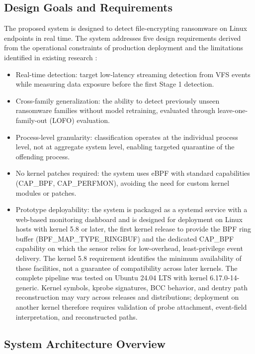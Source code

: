 \subsection{Design Goals and Requirements}\label{sec:3.1.1}

The proposed system is designed to detect file-encrypting ransomware on Linux endpoints in real time. The system addresses five design requirements derived from the operational constraints of production deployment and the limitations identified in existing research \cite{ref9}:

\begin{itemize}
\item Real-time detection: target low-latency streaming detection from VFS events while measuring data exposure before the first Stage 1 detection.
\item Cross-family generalization: the ability to detect previously unseen ransomware families without model retraining, evaluated through leave-one-family-out (LOFO) evaluation.
\item Process-level granularity: classification operates at the individual process level, not at aggregate system level, enabling targeted quarantine of the offending process.
\item No kernel patches required: the system uses eBPF with standard capabilities (CAP\_\allowbreak{}BPF, CAP\_\allowbreak{}PERFMON), avoiding the need for custom kernel modules or patches.
\item Prototype deployability: the system is packaged as a systemd service with a web-based monitoring dashboard and is designed for deployment on Linux hosts with kernel 5.8 or later, the first kernel release to provide the BPF ring buffer (BPF\_\allowbreak{}MAP\_\allowbreak{}TYPE\_\allowbreak{}RINGBUF) and the dedicated CAP\_\allowbreak{}BPF capability on which the sensor relies for low-overhead, least-privilege event delivery. The kernel 5.8 requirement identifies the minimum availability of these facilities, not a guarantee of compatibility across later kernels. The complete pipeline was tested on Ubuntu 24.04 LTS with kernel 6.17.0-14-generic. Kernel symbols, kprobe signatures, BCC behavior, and dentry path reconstruction may vary across releases and distributions; deployment on another kernel therefore requires validation of probe attachment, event-field interpretation, and reconstructed paths.
\end{itemize}

\subsection{System Architecture Overview}\label{sec:3.1.2}

